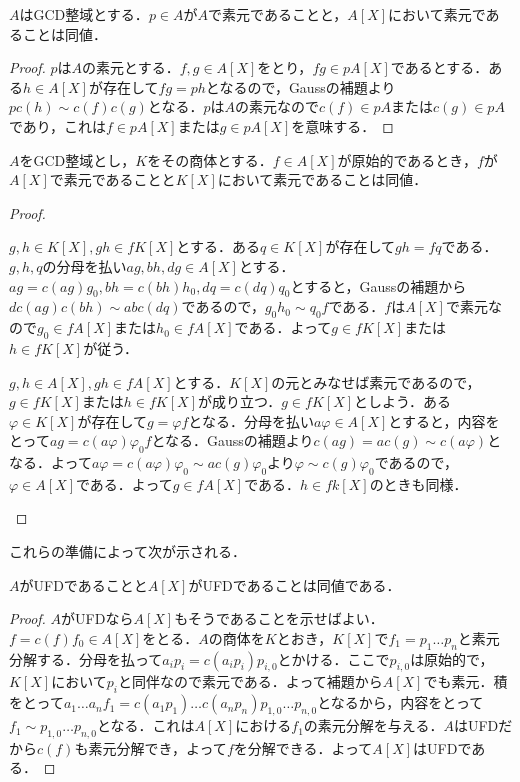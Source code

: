 \begin{prop}
	$A$はGCD整域とする．$p\in A$が$A$で素元であることと，$A[X]$において素元であることは同値．
\end{prop}

\begin{proof}
	$p$は$A$の素元とする．$f,g\in A[X]$をとり，$fg\in pA[X]$であるとする．ある$h\in A[X]$が存在して$fg=ph$となるので，Gaussの補題より$pc(h)\sim c(f)c(g)$となる．$p$は$A$の素元なので$c(f)\in pA$または$c(g)\in pA$であり，これは$f\in pA[X]$または$g\in pA[X]$を意味する．
\end{proof}

\begin{lem}
	$A$をGCD整域とし，$K$をその商体とする．$f\in A[X]$が原始的であるとき，$f$が$A[X]$で素元であることと$K[X]$において素元であることは同値．
\end{lem}
\begin{proof}
	\begin{eqv}
		\item $g,h\in K[X], gh\in fK[X]$とする．ある$q\in K[X]$が存在して$gh=fq$である．$g,h,q$の分母を払い$ag,bh,dg\in A[X]$とする．$ag=c(ag)g_0,bh=c(bh)h_0,dq=c(dq)q_0$とすると，Gaussの補題から$d c(ag)c(bh)\sim ab c(dq)$であるので，$g_0h_0\sim q_0f$である．$f$は$A[X]$で素元なので$g_0\in fA[X]$または$h_0\in fA[X]$である．よって$g\in fK[X]$または$h\in fK[X]$が従う．
		
		\item $g,h\in A[X], gh\in fA[X]$とする．$K[X]$の元とみなせば素元であるので，$g\in fK[X]$または$h\in fK[X]$が成り立つ．$g\in fK[X]$としよう．ある$\varphi\in K[X]$が存在して$g=\varphi f$となる．分母を払い$a\varphi\in A[X]$とすると，内容をとって$ag=c(a\varphi)\varphi_0f$となる．Gaussの補題より$c(ag)=ac(g)\sim c(a\varphi)$となる．よって$a\varphi=c(a\varphi)\varphi_0\sim ac(g)\varphi_0$より$\varphi\sim c(g)\varphi_0$であるので，$\varphi\in A[X]$である．よって$g\in fA[X]$である．$h\in fk[X]$のときも同様．
	\end{eqv}
\end{proof}

これらの準備によって次が示される．

\begin{thm}
	$A$がUFDであることと$A[X]$がUFDであることは同値である．
\end{thm}

\begin{proof}
	$A$がUFDなら$A[X]$もそうであることを示せばよい．$f=c(f)f_0\in A[X]$をとる．$A$の商体を$K$とおき，$K[X]$で$f_1=p_1\dots p_n$と素元分解する．分母を払って$a_ip_i=c(a_ip_i)p_{i,0}$とかける．ここで$p_{i,0}$は原始的で，$K[X]$において$p_i$と同伴なので素元である．よって補題から$A[X]$でも素元．積をとって$a_1\dots a_n f_1=c(a_1p_1)\dots c(a_np_n)p_{1,0}\dots p_{n,0}$となるから，内容をとって$f_1\sim p_{1,0}\dots p_{n,0}$となる．これは$A[X]$における$f_1$の素元分解を与える．$A$はUFDだから$c(f)$も素元分解でき，よって$f$を分解できる．よって$A[X]$はUFDである．
\end{proof}

